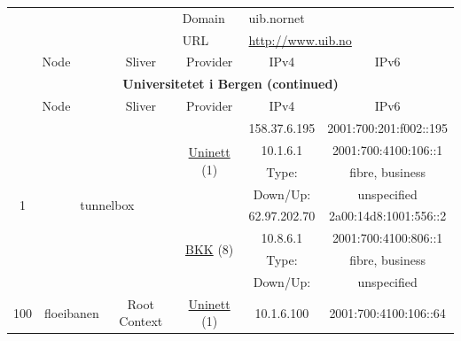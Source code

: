 \begin{small}
\begin{center}
\begin{longtable}{|c|c|c|c|c|c|c|c|}
 \multicolumn{4}{|c|}{} & \multicolumn{1}{|l|}{Domain} & \multicolumn{3}{|l|}{\index{uib.nornet}uib.nornet} \\* \cline{5-5}\cline{6-6}\cline{7-7}\cline{8-8}
 \multicolumn{4}{|c|}{} & \multicolumn{1}{|l|}{URL} & \multicolumn{3}{|l|}{\url{http://www.uib.no}} \\ \hline
 \multicolumn{2}{|p{8em}|}{Node} & \multicolumn{2}{|p{8em}|}{Sliver} & \multicolumn{2}{|p{8em}|}{Provider} & IPv4 & IPv6 \\ \hline
\endfirsthead
\hline
 \multicolumn{8}{|c|}{\textbf{Universitetet i Bergen (continued)}} \\ \hline
 \multicolumn{2}{|p{8em}|}{Node} & \multicolumn{2}{|p{8em}|}{Sliver} & \multicolumn{2}{|p{8em}|}{Provider} & IPv4 & IPv6 \\ \hline
\endhead
 \multirow{8}{*}{\tiny{1}} & \multicolumn{3}{|c|}{\multirow{8}{*}{\tiny{tunnelbox}}} & \multicolumn{2}{|c|}{\multirow{4}{*}{\tiny{\href{https://www.uninett.no}{Uninett} (1)}}} & \tiny{158.37.6.195} & \tiny{2001:700:201:f002::195} \\* \cline{7-7}\cline{8-8}
  & \multicolumn{3}{|c|}{} & \multicolumn{2}{|c|}{} & \tiny{10.1.6.1} & \tiny{2001:700:4100:106::1} \\* \cline{7-7}\cline{8-8}
  & \multicolumn{3}{|c|}{} & \multicolumn{2}{|c|}{} & Type: & fibre, business \\* \cline{7-7}\cline{8-8}
  & \multicolumn{3}{|c|}{} & \multicolumn{2}{|c|}{} & Down/Up:  & unspecified \\* \cline{5-5}\cline{6-6}\cline{7-7}\cline{8-8}
  & \multicolumn{3}{|c|}{} & \multicolumn{2}{|c|}{\multirow{4}{*}{\tiny{\href{http://bkk.no}{BKK} (8)}}} & \tiny{62.97.202.70} & \tiny{2a00:14d8:1001:556::2} \\* \cline{7-7}\cline{8-8}
  & \multicolumn{3}{|c|}{} & \multicolumn{2}{|c|}{} & \tiny{10.8.6.1} & \tiny{2001:700:4100:806::1} \\* \cline{7-7}\cline{8-8}
  & \multicolumn{3}{|c|}{} & \multicolumn{2}{|c|}{} & Type: & fibre, business \\* \cline{7-7}\cline{8-8}
  & \multicolumn{3}{|c|}{} & \multicolumn{2}{|c|}{} & Down/Up:  & unspecified \\ \hline
 \multirow{36}{*}{\tiny{100}} & \multicolumn{1}{|l|}{\multirow{36}{*}{\tiny{floeibanen}}} & \multicolumn{2}{|c|}{\multirow{2}{*}{\tiny{Root Context}}} & \multicolumn{2}{|c|}{\tiny{\href{https://www.uninett.no}{Uninett} (1)}} & \tiny{10.1.6.100} & \tiny{2001:700:4100:106::64} \\* \cline{5-5}\cline{6-6}\cline{7-7}\cline{8-8}

\end{longtable}
\end{center}
\end{small}
